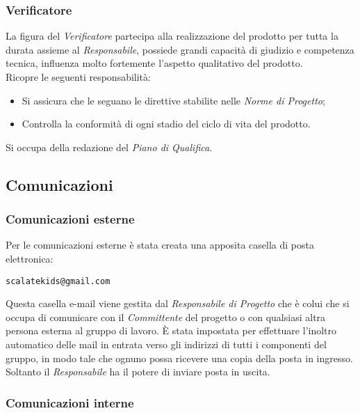 \documentclass{scalatekids-article}
\begin{document}
\subsubsection{Verificatore}

La figura del \textit{Verificatore} partecipa alla realizzazione del prodotto per
tutta la durata assieme al \textit{Responsabile}, possiede grandi capacità di
giudizio e competenza tecnica, influenza molto fortemente l'aspetto qualitativo
del prodotto.\\ Ricopre le seguenti responsabilità:
\begin{itemize}
    \item Si assicura che le  seguano le direttive stabilite nelle \textit{Norme di Progetto};
    \item Controlla la conformità di ogni stadio del ciclo di vita del prodotto.
\end{itemize}
Si occupa della redazione del \textit{Piano di Qualifica}.

\subsection{Comunicazioni}

\subsubsection{Comunicazioni esterne}

Per le comunicazioni esterne è stata creata una apposita casella di posta elettronica:
\begin{center}
    \verb=scalatekids@gmail.com=
\end{center}
Questa casella e-mail viene gestita dal \textit{Responsabile di Progetto} che è
colui che si occupa di comunicare con il \textit{Committente} del progetto o con
qualsiasi altra persona esterna al gruppo di lavoro. È stata impostata per
effettuare l'inoltro automatico delle mail in entrata verso gli indirizzi
di tutti i componenti del gruppo, in modo tale che ognuno possa ricevere una
copia della posta in ingresso. Soltanto il \textit{Responsabile} ha il
potere di inviare posta in uscita.

\subsubsection{Comunicazioni interne}
\end{document}
